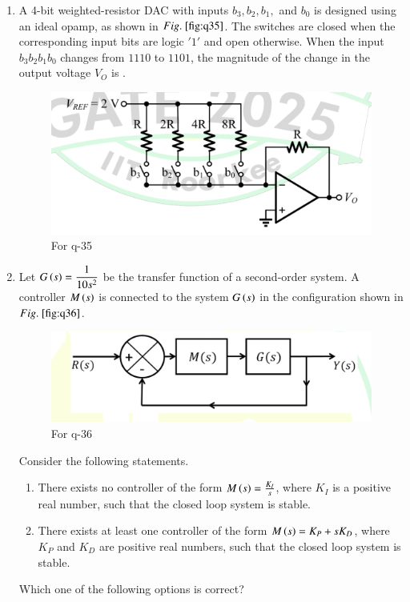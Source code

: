 \documentclass[journal,12pt,onecolumn]{IEEEtran}
\theoremstyle{remark}
\begin{document}
\begin{enumerate}
\hfill{}

\item A 4-bit weighted-resistor DAC with inputs $b_3, b_2, b_1,$ and $b_0$  is designed using an ideal opamp, as shown in $\figref{fig:q35}$. 
    The switches are closed when the corresponding input bits are logic $'1'$ and open otherwise. 
    When the input $b_3b_2b_1b_0$ changes from $1110$ to $1101$, the magnitude of the change in the output voltage $V_O$  is \underline{\hspace{2cm}}.
\begin{figure}[H]
\centering
\includegraphics[width=0.7\columnwidth]{q35}
\caption{For q-35}
\label{fig:q35}
\end{figure}

\hfill{}

\item Let $G\left(s\right) = \dfrac{1}{10s^2}$ be the transfer function of a second-order system. A controller $M\left(s\right)$ is connected to the system $G\left(s\right)$ in the configuration shown in $\figref{fig:q36}$.
\begin{figure}[H]
\centering
\includegraphics[width=0.5\columnwidth]{q36}
\caption{For q-36}
\label{fig:q36}
\end{figure}
Consider the following statements.
\begin{enumerate}[label=(\roman*)]
    \item There exists no controller of the form $M\left(s\right) = \frac{K_I}{s}$, where $K_I$ is a positive real number, such that the closed loop system is stable.
    \item There exists at least one controller of the form $M\left(s\right) = K_P + sK_D$, where $K_P$ and $K_D$ are positive real numbers, such that the closed loop system is stable.
\end{enumerate} 
Which one of the following options is correct?


\end{enumerate}
\end{document}
